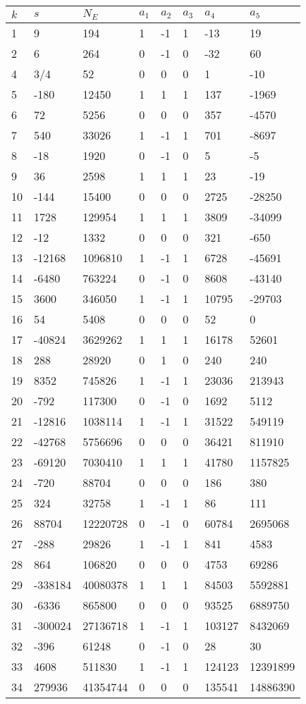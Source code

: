 \documentclass{amsart}
\begin{document}
\begin{longtable}{|l|l|l|lllll|}
\hline
$k$ & $s$ & $N_E$ & $a_1$ & $a_2$ & $a_3$ & $a_4$ & $a_5$\\
\hline
1&9&194&1&-1&1&-13&19\\
2&6&264&0&-1&0&-32&60\\
4&3/4&52&0&0&0&1&-10\\
5&-180&12450&1&1&1&137&-1969\\
6&72&5256&0&0&0&357&-4570\\
7&540&33026&1&-1&1&701&-8697\\
8&-18&1920&0&-1&0&5&-5\\
9&36&2598&1&1&1&23&-19\\
10&-144&15400&0&0&0&2725&-28250\\
11&1728&129954&1&1&1&3809&-34099\\
12&-12&1332&0&0&0&321&-650\\
13&-12168&1096810&1&-1&1&6728&-45691\\
14&-6480&763224&0&-1&0&8608&-43140\\
15&3600&346050&1&-1&1&10795&-29703\\
16&54&5408&0&0&0&52&0\\
17&-40824&3629262&1&1&1&16178&52601\\
18&288&28920&0&1&0&240&240\\
19&8352&745826&1&-1&1&23036&213943\\
20&-792&117300&0&-1&0&1692&5112\\
21&-12816&1038114&1&-1&1&31522&549119\\
22&-42768&5756696&0&0&0&36421&811910\\
23&-69120&7030410&1&1&1&41780&1157825\\
24&-720&88704&0&0&0&186&380\\
25&324&32758&1&-1&1&86&111\\
26&88704&12220728&0&-1&0&60784&2695068\\
27&-288&29826&1&-1&1&841&4583\\
28&864&106820&0&0&0&4753&69286\\
29&-338184&40080378&1&1&1&84503&5592881\\
30&-6336&865800&0&0&0&93525&6889750\\
31&-300024&27136718&1&-1&1&103127&8432069\\
32&-396&61248&0&-1&0&28&30\\
33&4608&511830&1&-1&1&124123&12391899\\
34&279936&41354744&0&0&0&135541&14886390\\

\end{longtable}
\end{document}
